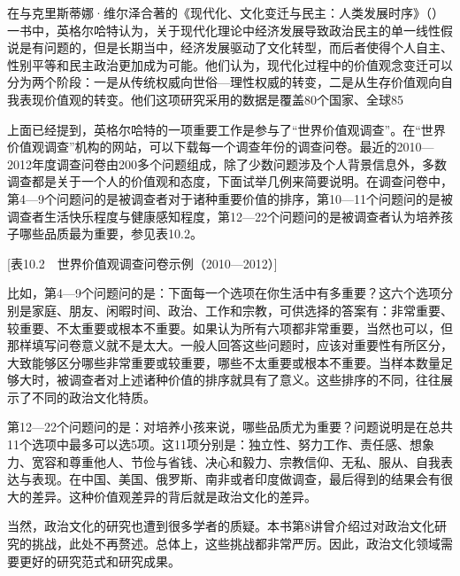 在与克里斯蒂娜·维尔泽合著的《现代化、文化变迁与民主：人类发展时序》（）一书中，英格尔哈特认为，关于现代化理论中经济发展导致政治民主的单一线性假说是有问题的，但是长期当中，经济发展驱动了文化转型，而后者使得个人自主、性别平等和民主政治更加成为可能。他们认为，现代化过程中的价值观念变迁可以分为两个阶段：一是从传统权威向世俗—理性权威的转变，二是从生存价值观向自我表现价值观的转变。他们这项研究采用的数据是覆盖80个国家、全球85%

上面已经提到，英格尔哈特的一项重要工作是参与了“世界价值观调查”。在“世界价值观调查”机构的网站，可以下载每一个调查年份的调查问卷。最近的2010—2012年度调查问卷由200多个问题组成，除了少数问题涉及个人背景信息外，多数调查都是关于一个人的价值观和态度，下面试举几例来简要说明。在调查问卷中，第4—9个问题问的是被调查者对于诸种重要价值的排序，第10—11个问题问的是被调查者生活快乐程度与健康感知程度，第12—22个问题问的是被调查者认为培养孩子哪些品质最为重要，参见表10.2。

[表10.2　世界价值观调查问卷示例（2010—2012）]


比如，第4—9个问题问的是：下面每一个选项在你生活中有多重要？这六个选项分别是家庭、朋友、闲暇时间、政治、工作和宗教，可供选择的答案有：非常重要、较重要、不太重要或根本不重要。如果认为所有六项都非常重要，当然也可以，但那样填写问卷意义就不是太大。一般人回答这些问题时，应该对重要性有所区分，大致能够区分哪些非常重要或较重要，哪些不太重要或根本不重要。当样本数量足够大时，被调查者对上述诸种价值的排序就具有了意义。这些排序的不同，往往展示了不同的政治文化特质。

第12—22个问题问的是：对培养小孩来说，哪些品质尤为重要？问题说明是在总共11个选项中最多可以选5项。这11项分别是：独立性、努力工作、责任感、想象力、宽容和尊重他人、节俭与省钱、决心和毅力、宗教信仰、无私、服从、自我表达与表现。在中国、美国、俄罗斯、南非或者印度做调查，最后得到的结果会有很大的差异。这种价值观差异的背后就是政治文化的差异。

当然，政治文化的研究也遭到很多学者的质疑。本书第8讲曾介绍过对政治文化研究的挑战，此处不再赘述。总体上，这些挑战都非常严厉。因此，政治文化领域需要更好的研究范式和研究成果。


